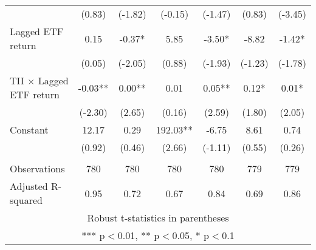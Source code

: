 \documentclass[]{article}
\begin{document}
\begin{tabular}{lcccccc}
 & (0.83) & (-1.82) & (-0.15) & (-1.47) & (0.83) & (-3.45) \\
Lagged ETF return & 0.15 & -0.37* & 5.85 & -3.50* & -8.82 & -1.42* \\
 & (0.05) & (-2.05) & (0.88) & (-1.93) & (-1.23) & (-1.78) \\
TII $\times$ Lagged ETF return & -0.03** & 0.00** & 0.01 & 0.05** & 0.12* & 0.01* \\
 & (-2.30) & (2.65) & (0.16) & (2.59) & (1.80) & (2.05) \\
Constant & 12.17 & 0.29 & 192.03** & -6.75 & 8.61 & 0.74 \\
 & (0.92) & (0.46) & (2.66) & (-1.11) & (0.55) & (0.26) \\
 &  &  &  &  &  &  \\
Observations & 780 & 780 & 780 & 780 & 779 & 779 \\
 Adjusted R-squared & 0.95 & 0.72 & 0.67 & 0.84 & 0.69 & 0.86 \\ \hline
\multicolumn{7}{c}{ Robust t-statistics in parentheses} \\
\multicolumn{7}{c}{ *** p$<$0.01, ** p$<$0.05, * p$<$0.1} \\
\end{tabular}
\end{document}
